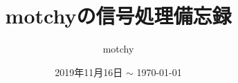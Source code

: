 \documentclass[dvipdfmx,uplatex,report]{jsbook}%
\theoremstyle{definition}%
\begin{document}
	\title{motchyの信号処理備忘録}
	\author{motchy}
	\date{ 2019年11月16日 $\sim$ \today}
	\maketitle
	{\scriptsize \tableofcontents}

	\newcommand{\cycConv}[2]{\underset{\text{cyc}}{{#1}*{#2}}}

	
	
	
	
	

	\begin{thebibliography}{99}
	\end{thebibliography}
\end{document}
